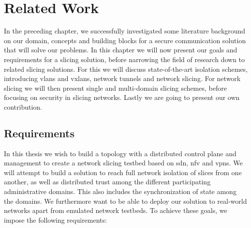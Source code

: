 \chapter{Related Work}
\label{related_work}




In the preceding chapter, we successfully investigated some literature background on our domain, concepts and building blocks for a secure communication solution that will solve our problems. In this chapter we will now present our goals and requirements for a slicing solution, before narrowing the field of research down to related slicing solutions. For this we will discuss state-of-the-art isolation schemes, introducing \acrshort{vlan}s and \acrshort{vxlan}s, network tunnels and network slicing. For network slicing we will then present single and multi-domain slicing schemes, before focusing on security in slicing networks. Lastly we are going to present our own contribution.


\section{Requirements}
\label{related_work_requirements}
In this thesis we wish to build a topology with a distributed control plane and management to create a network slicing testbed based on \acrshort{sdn}, \acrshort{nfv} and \acrshort{vpn}s. We will attempt to build a solution to reach full network isolation of slices from one another, as well as distributed trust among the different participating administrative domains. This also includes the synchronization of state among the domains. We furthermore want to be able to deploy our solution to real-world networks apart from emulated network testbeds.
To achieve these goals, we impose the following requirements:

